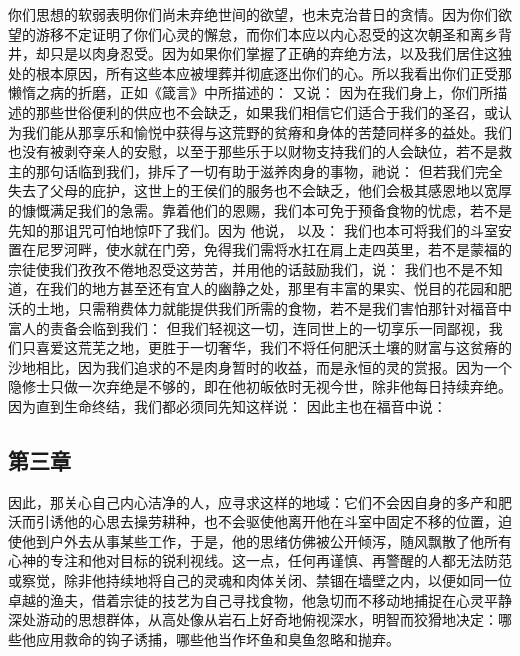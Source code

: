你们思想的软弱表明你们尚未弃绝世间的欲望，也未克治昔日的贪情。因为你们欲望的游移不定证明了你们心灵的懈怠，而你们本应以内心忍受的这次朝圣和离乡背井，却只是以肉身忍受。因为如果你们掌握了正确的弃绝方法，以及我们居住这独处的根本原因，所有这些本应被埋葬并彻底逐出你们的心。所以我看出你们正受那懒惰之病的折磨，正如《箴言》中所描述的： 又说： 因为在我们身上，你们所描述的那些世俗便利的供应也不会缺乏，如果我们相信它们适合于我们的圣召，或认为我们能从那享乐和愉悦中获得与这荒野的贫瘠和身体的苦楚同样多的益处。我们也没有被剥夺亲人的安慰，以至于那些乐于以财物支持我们的人会缺位，若不是救主的那句话临到我们，排斥了一切有助于滋养肉身的事物，祂说：  但若我们完全失去了父母的庇护，这世上的王侯们的服务也不会缺乏，他们会极其感恩地以宽厚的慷慨满足我们的急需。靠着他们的恩赐，我们本可免于预备食物的忧虑，若不是先知的那诅咒可怕地惊吓了我们。因为  他说， 以及： 我们也本可将我们的斗室安置在尼罗河畔，使水就在门旁，免得我们需将水扛在肩上走四英里，若不是蒙福的宗徒使我们孜孜不倦地忍受这劳苦，并用他的话鼓励我们，说：  我们也不是不知道，在我们的地方甚至还有宜人的幽静之处，那里有丰富的果实、悦目的花园和肥沃的土地，只需稍费体力就能提供我们所需的食物，若不是我们害怕那针对福音中富人的责备会临到我们：  但我们轻视这一切，连同世上的一切享乐一同鄙视，我们只喜爱这荒芜之地，更胜于一切奢华，我们不将任何肥沃土壤的财富与这贫瘠的沙地相比，因为我们追求的不是肉身暂时的收益，而是永恒的灵的赏报。因为一个隐修士只做一次弃绝是不够的，即在他初皈依时无视今世，除非他每日持续弃绝。因为直到生命终结，我们都必须同先知这样说：  因此主也在福音中说： \par


\subsection{第三章}

\par

因此，那关心自己内心洁净的人，应寻求这样的地域：它们不会因自身的多产和肥沃而引诱他的心思去操劳耕种，也不会驱使他离开他在斗室中固定不移的位置，迫使他到户外去从事某些工作，于是，他的思绪仿佛被公开倾泻，随风飘散了他所有心神的专注和他对目标的锐利视线。这一点，任何再谨慎、再警醒的人都无法防范或察觉，除非他持续地将自己的灵魂和肉体关闭、禁锢在墙壁之内，以便如同一位卓越的渔夫，借着宗徒的技艺为自己寻找食物，他急切而不移动地捕捉在心灵平静深处游动的思想群体，从高处像从岩石上好奇地俯视深水，明智而狡猾地决定：哪些他应用救命的钩子诱捕，哪些他当作坏鱼和臭鱼忽略和抛弃。\par

